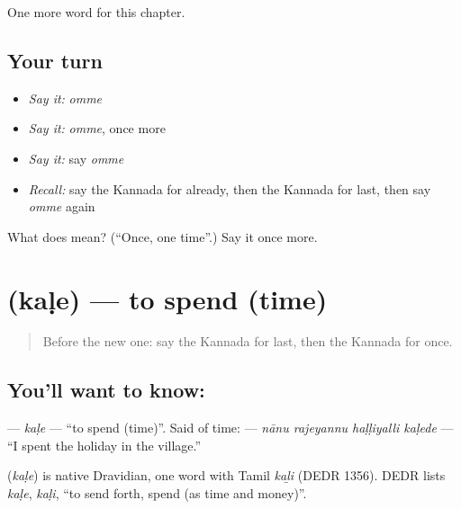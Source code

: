\begin{grammarlens}[title={What you've built}]
One more word for this chapter.
\end{grammarlens}

\subsection*{Your turn}
\begin{itemize}
\raggedright
  \item \emph{Say it:} \emph{omme}
  \item \emph{Say it:} \emph{omme}, once more
  \item \emph{Say it:} say \emph{omme}
  \item \emph{Recall:} say the Kannada for already, then the Kannada for last, then say \emph{omme} again
\end{itemize}

\begin{tcolorbox}[breakable,colback=teal!4,colframe=teal!35!black,title={Before you move on}]
What does  mean? (\textquotedblleft{}Once, one time\textquotedblright{}.) Say it once more.
\end{tcolorbox}
\section[\texorpdfstring{\kn{ಕಳೆ} (kaḷe)}{ಕಳೆ (kaḷe)}]{ (kaḷe) — to spend (time)}

\label{lesson:KA-C155-kale}



\begin{quote}
Before the new one: say the Kannada for last, then the Kannada for once.
\end{quote}

\subsection*{You'll want to know: }
\textbf{} — \emph{kaḷe} — \textquotedblleft{}to spend (time)\textquotedblright{}. Said of time: \textbf{   } — \emph{nānu rajeyannu haḷḷiyalli kaḷede} — \textquotedblleft{}I spent the holiday in the village.\textquotedblright{}

\begin{cousinweb}
\textbf{} (\emph{kaḷe}) is native Dravidian, one word with Tamil \emph{kaḻi} (DEDR 1356). DEDR lists \emph{kaḷe}, \emph{kaḷi}, \textquotedblleft{}to send forth, spend (as time and money)\textquotedblright{}.
\end{cousinweb}

